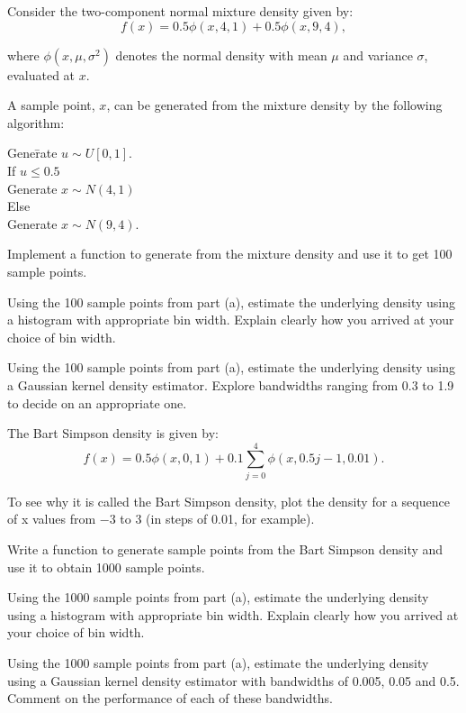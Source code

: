 \begin{exercise}
Consider the two-component normal mixture density given by:
$$f(x)=0.5\phi(x,4,1)+0.5\phi(x,9,4),$$

where $\phi(x,\mu,\sigma^2)$ denotes the normal density with mean $\mu$ and variance $\sigma$, evaluated at $x$.
\begin{asparaenum}[(a)]
\item A sample point, $x$, can be generated from the mixture density by the following algorithm:
\begin{tabbing}
Gene\=rate $u \sim U[0, 1]$.\\
If $u\leq 0.5$\\
	\>Generate $x \sim N(4, 1)$\\
Else\\
	\>Generate $x \sim N(9, 4)$.\\
\end{tabbing}

Implement a \Matlab function to generate from the mixture density and use it to get 100 sample points.

\item Using the 100 sample points from part (a), estimate the underlying density using a histogram with appropriate bin width. Explain clearly how you arrived at your choice of bin width.

\item Using the 100 sample points from part (a), estimate the underlying density using a Gaussian kernel density estimator. Explore bandwidths ranging from 0.3 to 1.9 to decide on an appropriate one.
\end{asparaenum}
\end{exercise}

\begin{exercise}
The Bart Simpson density is given by:
$$f(x)=0.5\phi(x,0,1)+0.1\sum^4_{j=0}\phi(x,0.5j-1,0.01).$$

To see why it is called the Bart Simpson density, plot the density for a sequence of x values from $-3$ to 3 (in steps of 0.01, for example).
\begin{asparaenum}[(a)]
\item Write a \Matlab function to generate sample points from the Bart Simpson density and use it to obtain 1000 sample points.
\item Using the 1000 sample points from part (a), estimate the underlying density using a histogram with appropriate bin width. Explain clearly how you arrived at your choice of bin width.
\item Using the 1000 sample points from part (a), estimate the underlying density using a Gaussian kernel density estimator with bandwidths of 0.005, 0.05 and 0.5. Comment on the performance of each of these bandwidths.
\end{asparaenum}
\end{exercise}


